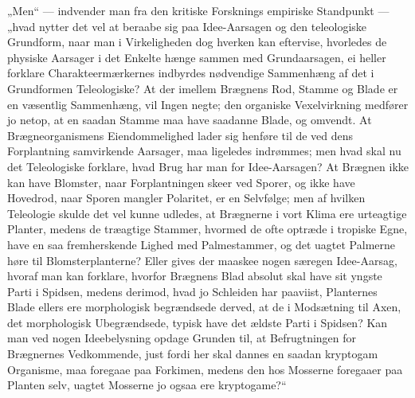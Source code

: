 \documentclass[12pt,a4paper]{book}
\begin{document}
„Men“ --- indvender man fra den kritiske Forsknings empiriske Standpunkt
--- „hvad nytter det vel at beraabe sig paa Idee-Aarsagen og den
teleologiske Grundform, naar man
i Virkeligheden dog hverken kan eftervise, hvorledes de physiske
Aarsager i det Enkelte hænge sammen med Grundaarsagen, ei heller
forklare Charakteermærkernes indbyrdes nødvendige Sammenhæng af det i
Grundformen Teleologiske? At der imellem Brægnens Rod, Stamme og Blade
er en væsentlig Sammenhæng, vil Ingen negte; den organiske
Vexelvirkning medfører jo netop, at en saadan Stamme maa have saadanne
Blade, og omvendt. At Brægneorganismens Eiendommelighed lader sig
henføre til de ved dens Forplantning samvirkende Aarsager, maa ligeledes
indrømmes; men hvad skal nu det Teleologiske forklare, hvad Brug har man
for Idee-Aarsagen? At Brægnen ikke kan have Blomster, naar Forplantningen
skeer ved Sporer, og ikke have Hovedrod, naar Sporen mangler Polaritet,
er en Selvfølge; men af hvilken Teleologie skulde det vel kunne udledes,
at Brægnerne i vort Klima ere urteagtige Planter, medens de træagtige
Stammer, hvormed de ofte optræde i tropiske Egne, have en saa
fremherskende Lighed med Palmestammer, og det uagtet Palmerne høre til
Blomsterplanterne? Eller gives der maaskee nogen særegen Idee-Aarsag,
hvoraf man kan forklare, hvorfor Brægnens Blad absolut skal have sit
yngste Parti i Spidsen, medens derimod, hvad jo Schleiden har paaviist,
Planternes Blade ellers ere morphologisk begrændsede derved, at de i
Modsætning til Axen, det morphologisk Ubegrændsede, typisk have det
ældste Parti i Spidsen? Kan man ved nogen Ideebelysning opdage Grunden
til, at Befrugtningen for Brægnernes Vedkommende, just fordi her skal
dannes en saadan kryptogam Organisme, maa foregaae paa Forkimen, medens
den hos Mosserne foregaaer paa Planten selv, uagtet Mosserne jo ogsaa
ere kryptogame?“
\end{document}

